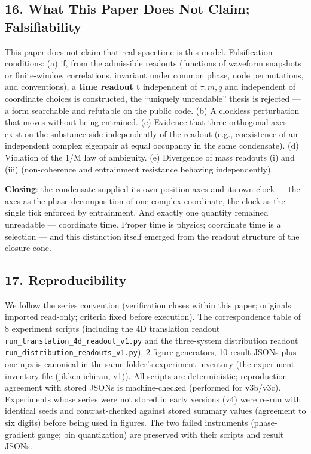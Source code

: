 \documentclass[
  a4paper,
]{article}
\begin{document}
\subsection{16. What This Paper Does Not Claim;
Falsifiability}\label{what-this-paper-does-not-claim-falsifiability}

This paper does not claim that real spacetime is this model.
Falsification conditions: (a) if, from the admissible readouts
(functions of waveform snapshots or finite-window correlations,
invariant under common phase, node permutations, and conventions), a
\textbf{time readout t} independent of \(\tau, m, q\) and independent of
coordinate choices is constructed, the ``uniquely unreadable'' thesis is
rejected --- a form searchable and refutable on the public code. (b) A
clockless perturbation that moves without being entrained. (c) Evidence
that three orthogonal axes exist on the substance side independently of
the readout (e.g., coexistence of an independent complex eigenpair at
equal occupancy in the same condensate). (d) Violation of the 1/M law of
ambiguity. (e) Divergence of mass readouts (i) and (iii) (non-coherence
and entrainment resistance behaving independently).

\textbf{Closing}: the condensate supplied its own position axes and its
own clock --- the axes as the phase decomposition of one complex
coordinate, the clock as the single tick enforced by entrainment. And
exactly one quantity remained unreadable --- coordinate time. Proper
time is physics; coordinate time is a selection --- and this distinction
itself emerged from the readout structure of the closure cone.

\subsection{17. Reproducibility}\label{reproducibility}

We follow the series convention (verification closes within this paper;
originals imported read-only; criteria fixed before execution). The
correspondence table of 8 experiment scripts (including the 4D
translation readout \texttt{run\_translation\_4d\_readout\_v1.py} and
the three-system distribution readout
\texttt{run\_distribution\_readouts\_v1.py}), 2 figure generators, 10
result JSONs plus one npz is canonical in the same folder's experiment
inventory (the experiment inventory file (jikken-ichiran, v1)). All
scripts are deterministic; reproduction agreement with stored JSONs is
machine-checked (performed for v3b/v3c). Experiments whose series were
not stored in early versions (v4) were re-run with identical seeds and
contrast-checked against stored summary values (agreement to six digits)
before being used in figures. The two failed instruments (phase-gradient
gauge; bin quantization) are preserved with their scripts and result
JSONs.
\end{document}
